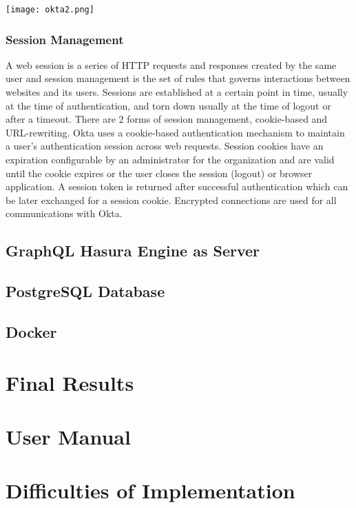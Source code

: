 \begin{center}
	\texttt{[image: okta2.png]}
\end{center}

\subsection{Session Management}

A web session is a series of HTTP requests and responses created by the same user and session management is the set of rules that governs interactions between websites and its users. Sessions are established at a certain point in time, usually at the time of authentication, and torn down usually at the time of logout or after a timeout. There are 2 forms of session management, cookie-based and URL-rewriting.
Okta uses a cookie-based authentication mechanism to maintain a user's authentication session across web requests. Session cookies have an expiration configurable by an administrator for the organization and are valid until the cookie expires or the user closes the session (logout) or browser application. A session token is returned after successful authentication which can be later exchanged for a session cookie. Encrypted connections are used for all communications with Okta.

\section{GraphQL Hasura Engine as Server}
\section{PostgreSQL Database}
\section{Docker}
\chapter{Final Results}
\chapter{User Manual}
\chapter{Difficulties of Implementation}
